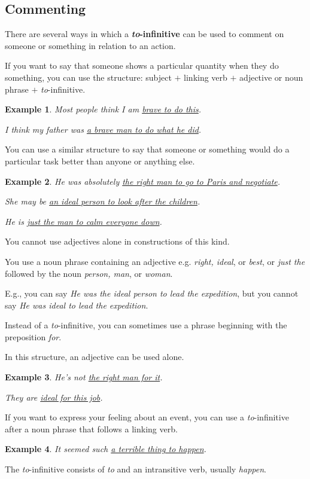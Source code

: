 \documentclass[oneside]{book}
\numberwithin{equation}{section}
\newtheorem{example}{Example}[section]
\begin{document}
\subsection{Commenting}
\noindent{} There are several ways in which a \textbf{\textit{to}-infinitive} can be used to comment on someone or something in relation to an action.

%
\noindent{} If you want to say that someone shows a particular quantity when they do something, you can use the structure: subject $+$ linking verb $+$ adjective or noun phrase $+$ \textit{to}-infinitive.
\begin{example}
    Most people think I am \underline{brave to do this}.
    
    I think my father was \underline{a brave man to do what he did}.
\end{example}
%
\noindent{} You can use a similar structure to say that someone or something would do a particular task better than anyone or anything else.
\begin{example}
    He was absolutely \underline{the right man to go to Paris and negotiate}.
    
    She may be \underline{an ideal person to look after the children}.
    
    He is \underline{just the man to calm everyone down}.
\end{example}
You cannot use adjectives alone in constructions of this kind.

You use a noun phrase containing an adjective e.g. \textit{right, ideal}, or \textit{best}, or \textit{just the} followed by the noun \textit{person, man}, or \textit{woman}.

E.g., you can say \textit{He was the ideal person to lead the expedition}, but you cannot say \textit{He was ideal to lead the expedition}.

%
Instead of a \textit{to}-infinitive, you can sometimes use a phrase beginning with the preposition \textit{for}.

In this structure, an adjective can be used alone.
\begin{example}
    He's not \underline{the right man for it}.
    
    They are \underline{ideal for this job}.
\end{example}
%
\noindent{} If you want to express your feeling about an event, you can use a \textit{to}-infinitive after a noun phrase that follows a linking verb.
\begin{example}
    It seemed such \underline{a terrible thing to happen}.    
\end{example}
The \textit{to}-infinitive consists of \textit{to} and an intransitive verb, usually \textit{happen}.
\end{document}
